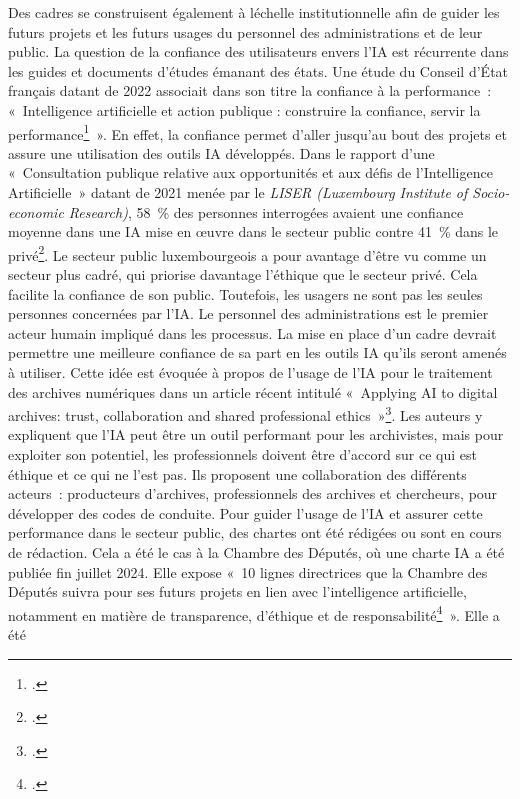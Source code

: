 Des cadres se construisent également à l\textquotesingle échelle
institutionnelle afin de guider les futurs projets et les futurs usages
du personnel des administrations et de leur public. La
question de la confiance des utilisateurs envers l'IA est récurrente
dans les guides et documents d'études émanant des états. Une étude du
Conseil d'État français datant de 2022 associait dans son titre la
confiance à la performance~: «~Intelligence artificielle et action
publique : construire la confiance, servir la performance\footcite{detat_intelligence_2022}~». 
En effet, la confiance permet d'aller jusqu'au bout des projets
et assure une utilisation des outils IA développés. Dans le rapport
d'une «~Consultation publique relative aux opportunités et aux défis de
l'Intelligence Artificielle~» datant de 2021 menée par le \emph{LISER
(Luxembourg Institute of Socio-economic Research)}, 58~\% des personnes
interrogées avaient une confiance moyenne dans une IA mise en œuvre dans
le secteur public contre 41~\% dans le privé\footcite{poussing_resultats_2021}.
Le secteur public luxembourgeois a pour avantage d'être vu comme un
secteur plus cadré, qui priorise davantage l'éthique que le secteur
privé. Cela facilite la confiance de son public. Toutefois, les usagers
ne sont pas les seules personnes concernées par l'IA. Le personnel des
administrations est le premier acteur humain impliqué dans les
processus. La mise en place d'un cadre devrait permettre une meilleure
confiance de sa part en les outils IA qu'ils seront amenés à utiliser.
Cette idée est évoquée à propos de l'usage de l'IA pour le traitement
des archives numériques dans un article récent intitulé «~Applying AI to
digital archives: trust, collaboration and shared professional
ethics~»\footcite{jaillant_applying_2023}. Les
auteurs y expliquent que l'IA peut être un outil performant pour les
archivistes, mais pour exploiter son potentiel, les professionnels
doivent être d'accord sur ce qui est éthique et ce qui ne l'est pas.
Ils proposent une collaboration des différents acteurs~: producteurs
d'archives, professionnels des archives et chercheurs, pour développer
des codes de conduite.
Pour guider l'usage de l'IA et assurer cette performance dans le secteur
public, des chartes ont été rédigées ou sont en cours de
rédaction. Cela a été le cas à la Chambre des Députés, où une
charte IA a été publiée fin juillet 2024. Elle expose «~10
lignes directrices que la Chambre des Députés suivra pour ses futurs
projets en lien avec l'intelligence artificielle, notamment en matière
de transparence, d'éthique et de responsabilité\footcite{noauthor_chambre_nodate}~». Elle a été
